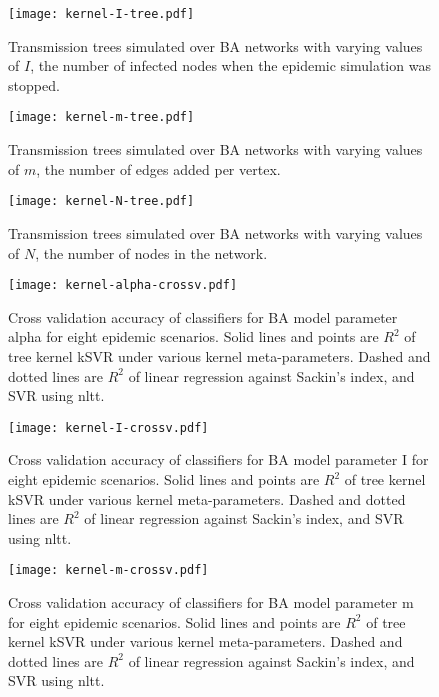 \begin{figure}
  \centering
  \texttt{[image: kernel-I-tree.pdf]}
  \caption{
    Transmission trees simulated over \gls{BA} networks with varying values of
    $I$, the number of infected nodes when the epidemic simulation was stopped.
  }
  \label{fig:Itrees}
\end{figure}

\begin{figure}
  \centering
  \texttt{[image: kernel-m-tree.pdf]}
  \caption{
    Transmission trees simulated over \gls{BA} networks with varying values of
    $m$, the number of edges added per vertex.
  }
  \label{fig:mtrees}
\end{figure}

\begin{figure}
  \centering
  \texttt{[image: kernel-N-tree.pdf]}
  \caption{
    Transmission trees simulated over \gls{BA} networks with varying values of
    $N$, the number of nodes in the network.
  }
  \label{fig:Ntrees}
\end{figure}

\begin{figure}
  \centering
  \texttt{[image: kernel-alpha-crossv.pdf]}
  \caption{
    Cross validation accuracy of classifiers for \gls{BA} model parameter
    \gls{alpha} for eight epidemic scenarios. Solid lines and points are
    $R^2$ of tree kernel \gls{kSVR} under various kernel meta-parameters.
    Dashed and dotted lines are $R^2$ of linear regression against Sackin's
    index, and \gls{SVR} using \gls{nltt}.
  }
  \label{fig:alphacrossv}
\end{figure}

\begin{figure}
  \centering
  \texttt{[image: kernel-I-crossv.pdf]}
  \caption{
    Cross validation accuracy of classifiers for \gls{BA} model parameter
    \gls{I} for eight epidemic scenarios. Solid lines and points are $R^2$ of
    tree kernel \gls{kSVR} under various kernel meta-parameters. Dashed and
    dotted lines are $R^2$ of linear regression against Sackin's index, and
    \gls{SVR} using \gls{nltt}.
  }
  \label{fig:Icrossv}
\end{figure}

\begin{figure}
  \centering
  \texttt{[image: kernel-m-crossv.pdf]}
  \caption{
    Cross validation accuracy of classifiers for \gls{BA} model parameter
    \gls{m} for eight epidemic scenarios. Solid lines and points are $R^2$ of
    tree kernel \gls{kSVR} under various kernel meta-parameters. Dashed and
    dotted lines are $R^2$ of linear regression against Sackin's index, and
    \gls{SVR} using \gls{nltt}.
  }
  \label{fig:mcrossv}
\end{figure}


